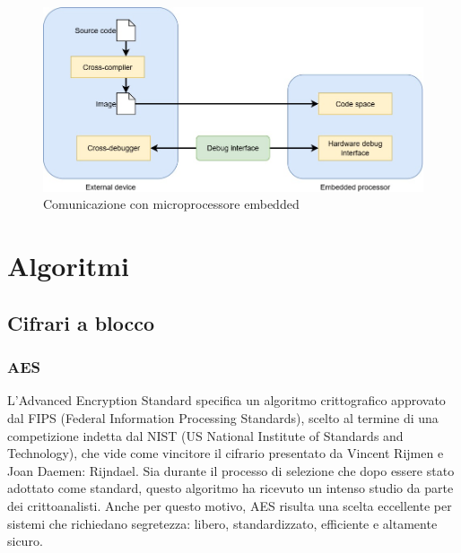 \documentclass[target=bach,aauheader=,style=]{thud}
\begin{document}
			\begin{figure}[h]
				\centering
				\includegraphics[width=0.5\linewidth]{img/cross-compiler-debugger.jpg}
				\caption{Comunicazione con microprocessore embedded}
				\label{fig:mcucomm}
			\end{figure}
			    		
\chapter{Algoritmi}
	\section{Cifrari a blocco}
		\subsection{AES}
		L'Advanced Encryption Standard specifica un algoritmo crittografico approvato dal FIPS (Federal Information Processing Standards), scelto al termine di una competizione indetta dal NIST (US National Institute of Standards and Technology), che vide come vincitore il cifrario presentato da Vincent Rijmen e Joan Daemen: Rijndael\cite{aes}. Sia durante il processo di selezione che dopo essere stato adottato come standard, questo algoritmo ha ricevuto un intenso studio da parte dei crittoanalisti. Anche per questo motivo, AES risulta una scelta eccellente per sistemi che richiedano segretezza: libero, standardizzato, efficiente e altamente sicuro. \cite{moderncrypto}
\end{document}
